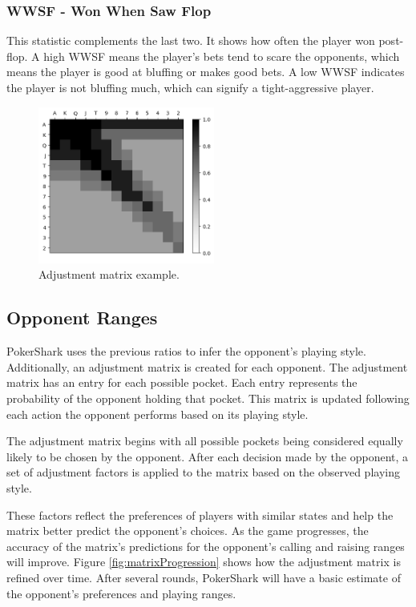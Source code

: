 \subsubsection{WWSF - Won When Saw Flop}
This statistic complements the last two. It shows how often the player won post-flop. A high WWSF means the player's bets tend to scare the opponents, which means the player is good at bluffing or makes good bets. A low WWSF indicates the player is not bluffing much, which can signify a tight-aggressive player.

\begin{figure}[h]
    \centering
    \includegraphics[width=5.8cm]{graphics/weights.png}
    \caption{Adjustment matrix example.}
    \label{fig:matrix}
\end{figure}

\subsection{Opponent Ranges}

PokerShark uses the previous ratios to infer the opponent's playing style. Additionally, an adjustment matrix is created for each opponent. The adjustment matrix has an entry for each possible pocket. Each entry represents the probability of the opponent holding that pocket. This matrix is updated following each action the opponent performs based on its playing style.

The adjustment matrix begins with all possible pockets being considered equally likely to be chosen by the opponent. After each decision made by the opponent, a set of adjustment factors is applied to the matrix based on the observed playing style.

These factors reflect the preferences of players with similar states and help the matrix better predict the opponent's choices.
As the game progresses, the accuracy of the matrix's predictions for the opponent's calling and raising ranges will improve. Figure \ref{fig:matrixProgression} shows how the adjustment matrix is refined over time. After several rounds, PokerShark will have a basic estimate of the opponent's preferences and playing ranges. 


